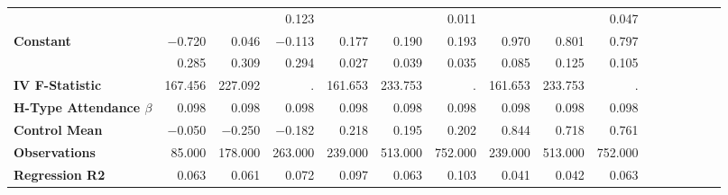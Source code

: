 \begin{tabular}{@{\extracolsep{5pt}}lrrrrrrrrrrrrrrr}
{\bf } & \phantom{***} & \phantom{***} & 0.123\phantom{\phantom{)}***} & \phantom{***} & \phantom{***} & 0.011\phantom{\phantom{)}***} & \phantom{***} & \phantom{***} & 0.047\phantom{\phantom{)}***} \\
{\bf Constant} & $-$0.720\phantom{\phantom{)}***} & 0.046\phantom{\phantom{)}***} & $-$0.113\phantom{\phantom{)}***} & 0.177\phantom{\phantom{)}***} & 0.190\phantom{\phantom{)}***} & 0.193\phantom{\phantom{)}***} & 0.970\phantom{\phantom{)}***} & 0.801\phantom{\phantom{)}***} & 0.797\phantom{\phantom{)}***} \\
{\bf } & 0.285\phantom{\phantom{)}***} & 0.309\phantom{\phantom{)}***} & 0.294\phantom{\phantom{)}***} & 0.027\phantom{\phantom{)}***} & 0.039\phantom{\phantom{)}***} & 0.035\phantom{\phantom{)}***} & 0.085\phantom{\phantom{)}***} & 0.125\phantom{\phantom{)}***} & 0.105\phantom{\phantom{)}***} \\
{\bf IV F-Statistic} & 167.456\phantom{\phantom{)}***} & 227.092\phantom{\phantom{)}***} & .\phantom{\phantom{)}***} & 161.653\phantom{\phantom{)}***} & 233.753\phantom{\phantom{)}***} & .\phantom{\phantom{)}***} & 161.653\phantom{\phantom{)}***} & 233.753\phantom{\phantom{)}***} & .\phantom{\phantom{)}***} \\
{\bf H-Type Attendance $\beta$} & 0.098\phantom{***} & 0.098\phantom{***} & 0.098\phantom{***} & 0.098\phantom{***} & 0.098\phantom{***} & 0.098\phantom{***} & 0.098\phantom{***} & 0.098\phantom{***} & 0.098\phantom{***} \\
{\bf Control Mean} & $-$0.050\phantom{***} & $-$0.250\phantom{***} & $-$0.182\phantom{***} & 0.218\phantom{***} & 0.195\phantom{***} & 0.202\phantom{***} & 0.844\phantom{***} & 0.718\phantom{***} & 0.761\phantom{***} \\
{\bf Observations} & 85.000\phantom{***} & 178.000\phantom{***} & 263.000\phantom{***} & 239.000\phantom{***} & 513.000\phantom{***} & 752.000\phantom{***} & 239.000\phantom{***} & 513.000\phantom{***} & 752.000\phantom{***} \\
{\bf Regression R2} & 0.063\phantom{***} & 0.061\phantom{***} & 0.072\phantom{***} & 0.097\phantom{***} & 0.063\phantom{***} & 0.103\phantom{***} & 0.041\phantom{***} & 0.042\phantom{***} & 0.063\phantom{***} \\
\hline
\end{tabular}
